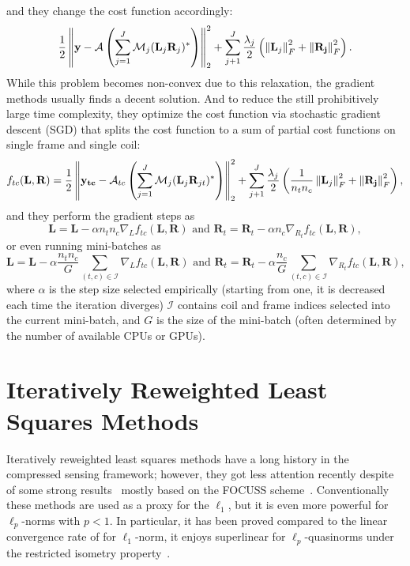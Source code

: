 and they change the cost function accordingly:
\[\frac{1}{2}\left\lVert\mathbf{y} - \mathcal{A}\left(\sum_{j=1}^J \mathcal{M}_j(\mathbf{L}_j\mathbf{R}_j)^*\right)\right\rVert_2^2 + \sum_{j+1}^J \frac{\lambda_j}{2} \left(\left\lVert\mathbf{L}_j\right\rVert_F^2 + \left\lVert\mathbf{R_j}\right\rVert_F^2\right).\]
While this problem becomes non-convex due to this relaxation, the gradient methods usually finds a decent solution. And to reduce the still prohibitively large time complexity, they optimize the cost function via stochastic gradient descent (SGD) that splits the cost function to a sum of partial cost functions on single frame and single coil:
\[f_{tc}(\mathbf{L,R}) = \frac{1}{2}\left\lVert\mathbf{y_{tc}} - \mathcal{A}_{tc}\left(\sum_{j=1}^J \mathcal{M}_j(\mathbf{L}_j\mathbf{R}_{jt})^*\right)\right\rVert_2^2 + \sum_{j+1}^J \frac{\lambda_j}{2} \left(\frac{1}{n_t n_c}\left\lVert\mathbf{L}_j\right\rVert_F^2 + \left\lVert\mathbf{R_j}\right\rVert_F^2\right),\]
and they perform the gradient steps as
\[\mathbf{L} = \mathbf{L} - \alpha n_t n_c \nabla_L f_{tc}(\mathbf{L,R}) \text{ and  } \mathbf{R}_t = \mathbf{R}_t - \alpha n_c \nabla_{R_t} f_{tc}(\mathbf{L,R}),\]
or even running mini-batches as
\[\mathbf{L} = \mathbf{L} - \alpha \frac{n_t n_c}{G} \sum_{(t,c) \in \mathcal{I}} \nabla_L f_{tc}(\mathbf{L,R}) \text{ and  } \mathbf{R}_t = \mathbf{R}_t - \alpha \frac{n_c}{G} \sum_{(t,c) \in \mathcal{I}} \nabla_{R_t} f_{tc}(\mathbf{L,R}),\]
where $\alpha$ is the step size selected empirically (starting from one, it is decreased each time the iteration diverges) $\mathcal{I}$ contains coil and frame indices selected into the current mini-batch, and $G$ is the size of the mini-batch (often determined by the number of available CPUs or GPUs).

\section{Iteratively Reweighted Least Squares Methods}
Iteratively reweighted least squares methods have a long history in the compressed sensing framework; however, they got less attention recently despite of some strong results~\cite{ramani_accelerated_2010, ongie_fast_2017, majumdar_non-convex_2013, dong_compressive_2014, chen_fast_2015} mostly based on the FOCUSS scheme~\cite{gorodnitsky_neuromagnetic_1995}. Conventionally these methods are used as a proxy for the $\ell_1$, but it is even more powerful for $\ell_p$-norms with $p < 1$. In particular, it has been proved compared to the linear convergence rate of for $\ell_1$-norm, it enjoys superlinear for $\ell_p$-quasinorms under the restricted isometry property~\cite{chartrand_iteratively_2008, daubechies_iteratively_2010}.

